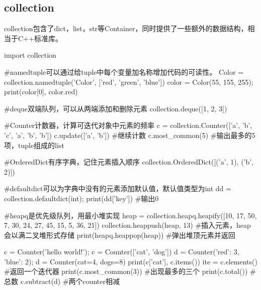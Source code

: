   \subsection{collection}
    collection包含了dict，list，str等Container，同时提供了一些额外的数据结构，相当于C++标准库。
    \begin{codeblock}[language=python, caption={namedtuple}]
      import collection

      #namedtuple可以通过给tuple中每个变量加名称增加代码的可读性。
      Color = collection.namedtuple('Color', ['red', 'green', 'blue'])
      color = Color(55, 155, 255); print(color[0], color.red)

      #deque双端队列，可以从两端添加和删除元素
      collection.deque([1, 2, 3])

      #Counter计数器，计算可迭代对象中元素的频率
      c = collection.Counter(['a', 'b', 'c', 'a', 'b', 'b'])
      c.update(['a', 'b']) #继续计数
      c.most_common(5) #输出最多的5项，tuple组成的list

      #OrderedDict有序字典，记住元素插入顺序
      collection.OrderedDict([('a', 1), ('b', 2)])
      
      #defaultdict可以为字典中没有的元素添加默认值，默认值类型为int
      dd = collection.defaultdict(int); print(dd['key']) #输出0 
      
      #heapq是优先级队列，用最小堆实现
      heap = collection.heapq.heapify([10, 17, 50, 7, 30, 24, 27, 45, 15, 5, 36, 21])
      collection.heappush(heap, 13) #插入元素，heap会以满二叉堆形式存储
      print(heapq.heappop(heap)) #弹出堆顶元素并返回

      c = Counter('hello world!'); c = Counter(['cat', 'dog'])
      d = Counter({'red': 3, 'blue': 2}); d = Counter(cat=4, dogs=8)
      print(c['cat'], c.items())
      ite = c.elements() #返回一个迭代器
      print(c.most_common(3)) #出现最多的三个
      print(c.total()) #总数
      c.subtract(d) #两个counter相减
    \end{codeblock}

